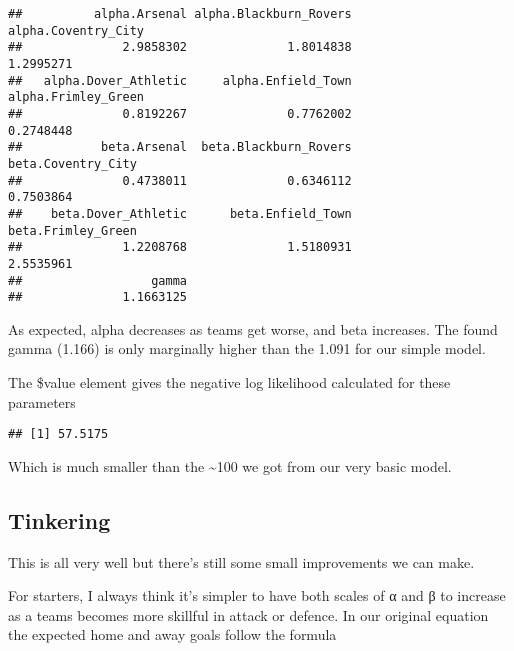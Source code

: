 \documentclass[]{article}
\newenvironment{Shaded}{\begin{snugshade}}{\end{snugshade}}
\newcommand{\CommentTok}[1]{\textcolor[rgb]{0.56,0.35,0.01}{\textit{#1}}}
\newcommand{\OperatorTok}[1]{\textcolor[rgb]{0.81,0.36,0.00}{\textbf{#1}}}
\newcommand{\NormalTok}[1]{#1}
\begin{document}
\begin{Shaded}
\end{Shaded}

\begin{verbatim}
##          alpha.Arsenal alpha.Blackburn_Rovers    alpha.Coventry_City 
##              2.9858302              1.8014838              1.2995271 
##   alpha.Dover_Athletic     alpha.Enfield_Town    alpha.Frimley_Green 
##              0.8192267              0.7762002              0.2748448 
##           beta.Arsenal  beta.Blackburn_Rovers     beta.Coventry_City 
##              0.4738011              0.6346112              0.7503864 
##    beta.Dover_Athletic      beta.Enfield_Town     beta.Frimley_Green 
##              1.2208768              1.5180931              2.5535961 
##                  gamma 
##              1.1663125
\end{verbatim}

As expected, alpha decreases as teams get worse, and beta increases. The
found gamma (1.166) is only marginally higher than the 1.091 for our
simple model.

The \$value element gives the negative log likelihood calculated for
these parameters

\begin{Shaded}
\end{Shaded}

\begin{verbatim}
## [1] 57.5175
\end{verbatim}

Which is much smaller than the \textasciitilde{}100 we got from our very
basic model.

\subsection{Tinkering}\label{tinkering}

This is all very well but there's still some small improvements we can
make.

For starters, I always think it's simpler to have both scales of α and β
to increase as a teams becomes more skillful in attack or defence. In
our original equation the expected home and away goals follow the
formula
\end{document}
